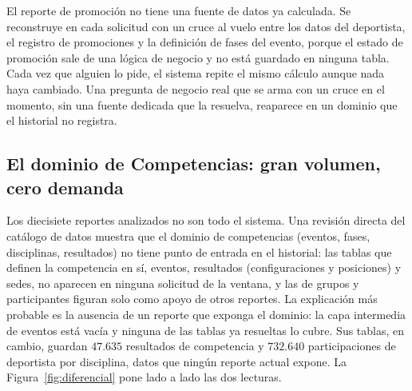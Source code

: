 \documentclass[11pt,letterpaper]{article}
\numberwithin{equation}{section}
\begin{document}
El reporte de promoción no tiene una fuente de datos ya calculada. Se reconstruye en cada solicitud con un cruce al vuelo entre los datos del deportista, el registro de promociones y la definición de fases del evento, porque el estado de promoción sale de una lógica de negocio y no está guardado en ninguna tabla. Cada vez que alguien lo pide, el sistema repite el mismo cálculo aunque nada haya cambiado. Una pregunta de negocio real que se arma con un cruce en el momento, sin una fuente dedicada que la resuelva, reaparece en un dominio que el historial no registra.

\subsection{El dominio de Competencias: gran volumen, cero demanda}
\label{sec:competencias}
Los diecisiete reportes analizados no son todo el sistema. Una revisión directa del catálogo de datos muestra que el dominio de competencias (eventos, fases, disciplinas, resultados) no tiene punto de entrada en el historial: las tablas que definen la competencia en sí, eventos, resultados (configuraciones y posiciones) y sedes, no aparecen en ninguna solicitud de la ventana, y las de grupos y participantes figuran solo como apoyo de otros reportes. La explicación más probable es la ausencia de un reporte que exponga el dominio: la capa intermedia de eventos está vacía y ninguna de las tablas ya resueltas lo cubre. Sus tablas, en cambio, guardan $47.635$ resultados de competencia y $732.640$ participaciones de deportista por disciplina, datos que ningún reporte actual expone. La Figura~\ref{fig:diferencial} pone lado a lado las dos lecturas.
\end{document}
